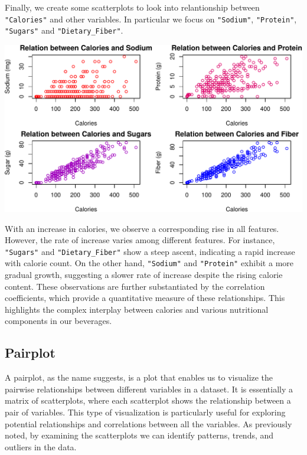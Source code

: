 \documentclass[
]{article}
\begin{document}
Finally, we create some scatterplots to look into relantionship between
\texttt{"Calories"} and other variables. In particular we focus on
\texttt{"Sodium"}, \texttt{"Protein"}, \texttt{"Sugars"} and
\texttt{"Dietary\_Fiber"}.

\begin{center}\includegraphics{Statistical_Learning_Final_Report_files/figure-latex/scatterplot-1} \end{center}

With an increase in calories, we observe a corresponding rise in all
features. However, the rate of increase varies among different features.
For instance, \texttt{"Sugars"} and \texttt{"Dietary\_Fiber"} show a
steep ascent, indicating a rapid increase with calorie count. On the
other hand, \texttt{"Sodium"} and \texttt{"Protein"} exhibit a more
gradual growth, suggesting a slower rate of increase despite the rising
calorie content. These observations are further substantiated by the
correlation coefficients, which provide a quantitative measure of these
relationships. This highlights the complex interplay between calories
and various nutritional components in our beverages.

\subsection{Pairplot}\label{pairplot}

A pairplot, as the name suggests, is a plot that enables us to visualize
the pairwise relationships between different variables in a dataset. It
is essentially a matrix of scatterplots, where each scatterplot shows
the relationship between a pair of variables. This type of visualization
is particularly useful for exploring potential relationships and
correlations between all the variables. As previously noted, by
examining the scatterplots we can identify patterns, trends, and
outliers in the data.
\end{document}
